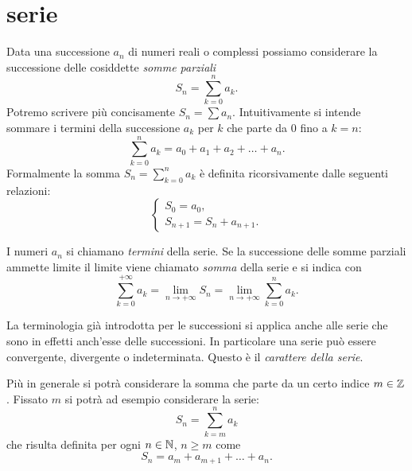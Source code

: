 \chapter{serie}

Data una successione $a_n$ di numeri reali o complessi
possiamo considerare la successione
delle cosiddette \emph{somme parziali}%
%
\[
  S_n = \sum_{k=0}^{n} a_k.
\]
Potremo scrivere più concisamente $S_n = \sum a_n$.
Intuitivamente si intende sommare i termini della successione $a_k$
per $k$ che parte da $0$ fino a $k=n$:
\[
  \sum_{k=0}^n a_k = a_0 + a_1 + a_2 + \dots + a_n.
\]
Formalmente la somma $S_n=\displaystyle \sum_{k=0}^n a_k$
è definita ricorsivamente
dalle seguenti relazioni:
\[
  \begin{cases}
    S_0 = a_0, \\
    S_{n+1} = S_n + a_{n+1}.
  \end{cases}
\]

I numeri $a_n$ si chiamano \emph{termini}%
%
 della serie.
%
Se la successione delle somme parziali ammette limite il limite viene chiamato
\emph{somma}%
%
%
della serie e si indica con
\[
  \sum_{k=0}^{+\infty} a_k = \lim_{n\to +\infty} S_n = \lim_{n\to+\infty} \sum_{k=0}^n a_k.
\]

La terminologia già introdotta per le successioni si applica anche alle
serie che sono in effetti anch'esse delle successioni.
In particolare una serie può essere convergente, divergente o indeterminata.
Questo è il \emph{carattere della serie}.
%
%
%

Più in generale si potrà considerare la somma che parte da un certo
indice $m\in {\mathbb Z}$.
Fissato $m$ si potrà ad esempio considerare la serie:
\[
  S_n = \sum_{k=m}^n a_k
\]
che risulta definita per ogni $n\in{\mathbb N}$, $n\ge m$
come
\[
  S_n = a_m + a_{m+1} + \dots + a_n.
\]

